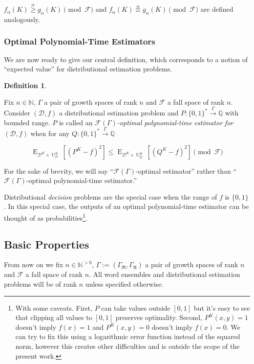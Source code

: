 \documentclass[11pt]{article}
\numberwithin{equation}{section}
\theoremstyle{definition}
\newtheorem{definition}{Definition}[section]
\theoremstyle{plain}
\newcommand{\Bool}{\{0,1\}}
\newcommand{\Words}{{\Bool^*}}
\DeclareMathOperator{\E}{E}
\DeclareMathOperator{\Un}{U}
\newcommand{\Nats}{\mathbb{N}}
\newcommand{\Rats}{\mathbb{Q}}
\newcommand{\Dist}{\mathcal{D}}
\newcommand{\GrowR}{\Gamma_{\mathfrak{R}}}
\newcommand{\GrowA}{\Gamma_{\mathfrak{A}}}
\newcommand{\Grow}{\Gamma:=(\GrowR,\GrowA)}
\newcommand{\Fall}{\mathcal{F}}
\newcommand{\EG}{\Fall(\Gamma)}
\newcommand{\Scheme}{\xrightarrow{\Gamma}}
\begin{document}
${f_\alpha(K) \overset{\alpha}{\geq} g_\alpha(K) \pmod \Fall}$ and ${f_\alpha(K) \overset{\alpha}{\equiv} g_\alpha(K) \pmod \Fall}$ are defined analogously.

\subsubsection{Optimal Polynomial-Time Estimators}

We are now ready to give our central definition, which corresponds to a notion of \enquote{expected value} for distributional estimation problems.

\begin{definition}
\label{def:op}

Fix $n \in \Nats$, $\Gamma$ a pair of growth spaces of rank $n$ and $\Fall$ a fall space of rank $n$. Consider $(\Dist,f)$ a distributional estimation problem and $P: \Words \Scheme \Rats$ with bounded range. $P$ is called an \emph{$\EG$-optimal polynomial-time estimator for $(\Dist,f)$} when for any $Q: \Words \Scheme \Rats$

\begin{equation}
\label{eqn:op}
\E_{\Dist^{K} \times \Un_P^K}[(P^K - f)^2] \leq \E_{\Dist^{K} \times \Un_Q^K}[(Q^K - f)^2] \pmod \Fall
\end{equation}

For the sake of brevity, we will say \enquote{${\EG}$-optimal estimator} rather than \enquote{${\EG}$-optimal polynomial-time estimator.}

\end{definition}

Distributional \emph{decision} problems are the special case when the range of $f$ is $\Bool$. In this special case, the outputs of an optimal polynomial-time estimator can be thought of as probabilities\footnote{With some caveats. First, $P$ can take values outside $[0,1]$ but it's easy to see that clipping all values to $[0,1]$ preserves optimality. Second, $P^{K}(x,y)=1$ doesn't imply $f(x) = 1$ and $P^{K}(x,y)=0$ doesn't imply $f(x)=0$. We can try to fix this using a logarithmic error function instead of the squared norm, however this creates other difficulties and is outside the scope of the present work.}.

\subsection{Basic Properties}

From now on we fix $n \in \Nats^{>0}$, $\Grow$ a pair of growth spaces of rank $n$ and $\Fall$ a fall space of rank $n$. All word ensembles and distributional estimation problems will be of rank ${n}$ unless specified otherwise.
\end{document}
